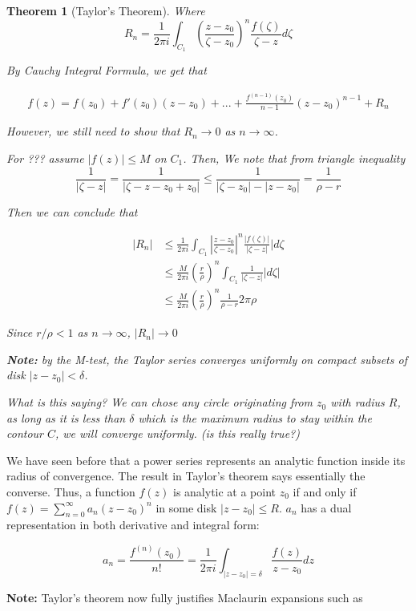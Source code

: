 \documentclass{article}
\newtheorem{theorem}{Theorem}[section]
\theoremstyle{definition}
\begin{document}
\begin{theorem}[Taylor's Theorem]
Where 
$$R_n = \frac{1}{2 \pi i } \int_{C_1} \left(\frac{z-z_0}{\zeta - z_0}\right)^n \frac{f(\zeta)}{\zeta - z}d\zeta$$

By Cauchy Integral Formula, we get that 

\begin{align}
f(z) = f(z_0) + f'(z_0)(z-z_0) + ... + \frac{f^{(n-1)}(z_0)}{n-1}(z-z_0)^{n-1} + R_n
\end{align}

However, we still need to show that $R_n \to 0$ as $n \to \infty$. 

For ??? assume $|f(z)| \leq M $ on $C_1$. Then,
We note that from triangle inequality $$\frac{1}{|\zeta-z|} = \frac{1}{|\zeta - z - z_0 + z_0|} \leq \frac{1}{|\zeta - z_0| - |z-z_0|} = \frac{1}{\rho - r}$$

Then we can conclude that

\begin{align}
|R_n| &\leq \frac{1}{2 \pi i } \int_{C_1} \left|\frac{z-z_0}{\zeta - z_0}\right|^n \frac{|f(\zeta)|}{|\zeta - z|}|d\zeta \\ 
&\leq \frac{M}{2 \pi i } \left(\frac{r}{\rho}\right)^n \int_{C_1} \frac{1}{|\zeta-z|}|d\zeta| \\
&\leq \frac{M}{2 \pi i } \left(\frac{r}{\rho}\right)^n \frac{1}{\rho - r} 2 \pi \rho 
\end{align}

Since $r/\rho < 1$ as $n \to \infty$, $|R_n| \to 0$

\textbf{Note:} by the M-test, the Taylor series converges uniformly on  compact subsets of disk $|z-z_0|<\delta$. 


What is this saying? We can chose any circle originating from $z_0$ with radius $R$, as long as it is less than $\delta$ which is the maximum radius to stay within the contour $C$, we will converge uniformly. (is this really true?)
\end{theorem}

We have seen before that a power series represents an analytic function inside its radius of convergence. The result in Taylor's theorem says essentially the converse. Thus, a function $f(z)$ is analytic at a point $z_0$ if and only if $f(z) = \sum_{n=0}^{\infty}a_n(z-z_0)^n$ in some disk $|z-z_0| \leq R$. $a_n$ has a dual representation in both derivative and integral form:

$$a_n  = \frac{f^(n)(z_0)}{n!} = \frac{1}{2 \pi i } \int_{|z-z_0|=\delta} \frac{f(z)}{z - z_0} dz$$


\textbf{Note:} Taylor's theorem now fully justifies Maclaurin expansions such as 
\end{document}
